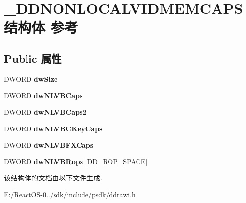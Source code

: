 \hypertarget{struct___d_d_n_o_n_l_o_c_a_l_v_i_d_m_e_m_c_a_p_s}{}\section{\+\_\+\+D\+D\+N\+O\+N\+L\+O\+C\+A\+L\+V\+I\+D\+M\+E\+M\+C\+A\+P\+S结构体 参考}
\label{struct___d_d_n_o_n_l_o_c_a_l_v_i_d_m_e_m_c_a_p_s}
\subsection*{Public 属性}
\begin{DoxyCompactItemize}
\item 
\mbox{\label{struct___d_d_n_o_n_l_o_c_a_l_v_i_d_m_e_m_c_a_p_s_acee6288d24aacc6d33d0499e075ca089}} 
D\+W\+O\+RD {\bfseries dw\+Size}
\item 
\mbox{\label{struct___d_d_n_o_n_l_o_c_a_l_v_i_d_m_e_m_c_a_p_s_a4aec37b2dfb7888c61217a20db3e24c6}} 
D\+W\+O\+RD {\bfseries dw\+N\+L\+V\+B\+Caps}
\item 
\mbox{\label{struct___d_d_n_o_n_l_o_c_a_l_v_i_d_m_e_m_c_a_p_s_a64df6f11bcd7a62def10a03c53721a16}} 
D\+W\+O\+RD {\bfseries dw\+N\+L\+V\+B\+Caps2}
\item 
\mbox{\label{struct___d_d_n_o_n_l_o_c_a_l_v_i_d_m_e_m_c_a_p_s_ae3f0246ec72eb29ed565ca8c83d8c1fa}} 
D\+W\+O\+RD {\bfseries dw\+N\+L\+V\+B\+C\+Key\+Caps}
\item 
\mbox{\label{struct___d_d_n_o_n_l_o_c_a_l_v_i_d_m_e_m_c_a_p_s_a3c0f8fc04b225872210b2f87b94502ed}} 
D\+W\+O\+RD {\bfseries dw\+N\+L\+V\+B\+F\+X\+Caps}
\item 
\mbox{\label{struct___d_d_n_o_n_l_o_c_a_l_v_i_d_m_e_m_c_a_p_s_a230a6a62c51f08d8e39b70ca22bc996e}} 
D\+W\+O\+RD {\bfseries dw\+N\+L\+V\+B\+Rops} \mbox{[}D\+D\+\_\+\+R\+O\+P\+\_\+\+S\+P\+A\+CE\mbox{]}
\end{DoxyCompactItemize}


该结构体的文档由以下文件生成\+:\begin{DoxyCompactItemize}
\item 
E\+:/\+React\+O\+S-\/0../sdk/include/psdk/ddrawi.\+h\end{DoxyCompactItemize}
